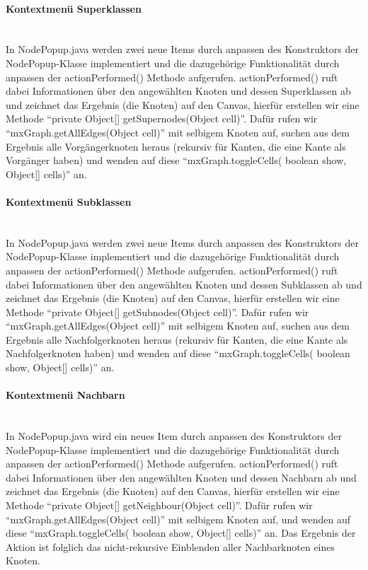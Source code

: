 \documentclass[10pt,a4paper]{article}
\begin{document}
\paragraph{Kontextmenü Superklassen}\ \\ 
In NodePopup.java werden zwei neue Items durch anpassen des Konstruktors der NodePopup-Klasse implementiert und die dazugehörige Funktionalität durch anpassen der actionPerformed() Methode aufgerufen. actionPerformed() ruft dabei Informationen über den angewählten Knoten und dessen Superklassen ab und zeichnet das Ergebnis (die Knoten) auf den Canvas, hierfür erstellen wir eine Methode "`private Object[] getSupernodes(Object cell)"'. Dafür rufen wir "`mxGraph.getAllEdges(Object cell)"' mit selbigem Knoten auf, suchen aus dem Ergebnis alle Vorgängerknoten heraus (rekursiv für Kanten, die eine Kante als Vorgänger haben) und wenden auf diese "`mxGraph.toggleCells( boolean show, Object[] cells)"' an.

\paragraph{Kontextmenü Subklassen}\ \\ 
In NodePopup.java werden zwei neue Items durch anpassen des Konstruktors der NodePopup-Klasse implementiert und die dazugehörige Funktionalität durch anpassen der actionPerformed() Methode aufgerufen. actionPerformed() ruft dabei Informationen über den angewählten Knoten und dessen Subklassen ab und zeichnet das Ergebnis (die Knoten) auf den Canvas, hierfür erstellen wir eine Methode "`private Object[] getSubnodes(Object cell)"'. Dafür rufen wir "`mxGraph.getAllEdges(Object cell)"' mit selbigem Knoten auf, suchen aus dem Ergebnis alle Nachfolgerknoten heraus (rekursiv für Kanten, die eine Kante als Nachfolgerknoten haben) und wenden auf diese "`mxGraph.toggleCells( boolean show, Object[] cells)"' an.

\paragraph{Kontextmenü Nachbarn}\ \\ 
In NodePopup.java wird ein neues Item durch anpassen des Konstruktors der NodePopup-Klasse implementiert und die dazugehörige Funktionalität durch anpassen der actionPerformed() Methode aufgerufen. actionPerformed() ruft dabei Informationen über den angewählten Knoten und dessen Nachbarn ab und zeichnet das Ergebnis (die Knoten) auf den Canvas, hierfür erstellen wir eine Methode "`private Object[] getNeighbour(Object cell)"'. Dafür rufen wir "`mxGraph.getAllEdges(Object cell)"' mit selbigem Knoten auf, und wenden auf diese "`mxGraph.toggleCells( boolean show, Object[] cells)"' an. Das Ergebnis der Aktion ist folglich das nicht-rekursive Einblenden aller Nachbarknoten eines Knoten.
\end{document}
